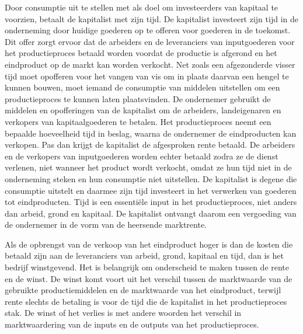 Door consumptie uit te stellen met als doel om investeerders van kapitaal te voorzien, betaalt de kapitalist met zijn tijd. De kapitalist investeert zijn tijd in de onderneming door huidige goederen op te offeren voor goederen in de toekomst. Dit offer zorgt ervoor dat de arbeiders en de leveranciers van inputgoederen voor het productieproces betaald worden voordat de productie is afgerond en het eindproduct op de markt kan worden verkocht. Net zoals een afgezonderde visser tijd moet opofferen voor het vangen van vis om in plaats daarvan een hengel te kunnen bouwen, moet iemand de consumptie van middelen uitstellen om een productieproces te kunnen laten plaatsvinden. De ondernemer gebruikt de middelen en opofferingen van de kapitalist om de arbeiders, landeigenaren en verkopers van kapitaalgoederen te betalen. Het productieproces neemt een bepaalde hoeveelheid tijd in beslag, waarna de ondernemer de eindproducten kan verkopen. Pas dan krijgt de kapitalist de afgesproken rente betaald. De arbeiders en de verkopers van inputgoederen worden echter betaald zodra ze de dienst verlenen, niet wanneer het product wordt verkocht, omdat ze hun tijd niet in de onderneming steken en hun consumptie niet uitstellen. De kapitalist is degene die consumptie uitstelt en daarmee zijn tijd investeert in het verwerken van goederen tot eindproducten. Tijd is een essentiële input in het productieproces, niet anders dan arbeid, grond en kapitaal. De kapitalist ontvangt daarom een vergoeding van de ondernemer in de vorm van de heersende marktrente.

Als de opbrengst van de verkoop van het eindproduct hoger is dan de kosten die betaald zijn aan de leveranciers van arbeid, grond, kapitaal en tijd, dan is het bedrijf winstgevend. Het is belangrijk om onderscheid te maken tussen de rente en de winst. De winst komt voort uit het verschil tussen de marktwaarde van de gebruikte productiemiddelen en de marktwaarde van het eindproduct, terwijl rente slechts de betaling is voor de tijd die de kapitalist in het productieproces stak. De winst of het verlies is met andere woorden het verschil in marktwaardering van de inputs en de outputs van het productieproces.

